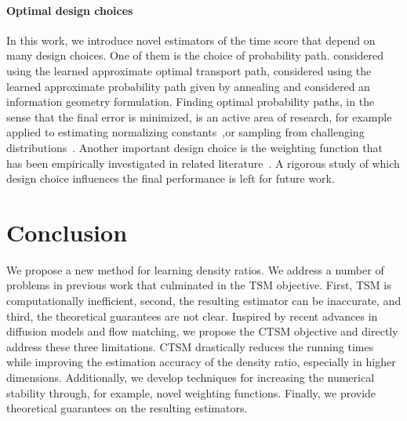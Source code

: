 \paragraph{Optimal design choices}
In this work, we introduce novel estimators of the time score that depend on many design choices. One of them is the choice of probability path. \citet{Xu2024} considered using the learned approximate optimal transport path, \citet{Wu2024} considered using the learned approximate probability path given by annealing and \citet{Kimura2024} considered an information geometry formulation. Finding optimal probability paths, in the sense that the final error is minimized, is an active area of research, for example applied to estimating normalizing constants~\citet{Chehab2023optimizing},or sampling from challenging distributions~\citep{guo2024provablebenefitannealedlangevin}. Another important design choice is the weighting function that has been empirically investigated in related literature~\citep{kingma2023diffusion,chen2023noisescheduling}. A rigorous study of which design choice influences the final performance is left for future work.

\section{Conclusion} We propose a new method for learning density ratios. We address a number of problems in previous work \citep{Rhodes2020,choi2022densityratio} that culminated in the TSM objective. First, TSM is computationally inefficient, second, the resulting estimator can be inaccurate, and third, the theoretical guarantees are not clear. Inspired by recent advances in diffusion models and flow matching, we propose the CTSM objective and directly address these three limitations. CTSM drastically reduces the running times while improving the estimation accuracy of the density ratio, especially in higher dimensions. Additionally, we develop techniques for increasing the numerical stability through, for example, novel weighting functions. Finally, we provide theoretical guarantees on the resulting estimators.







